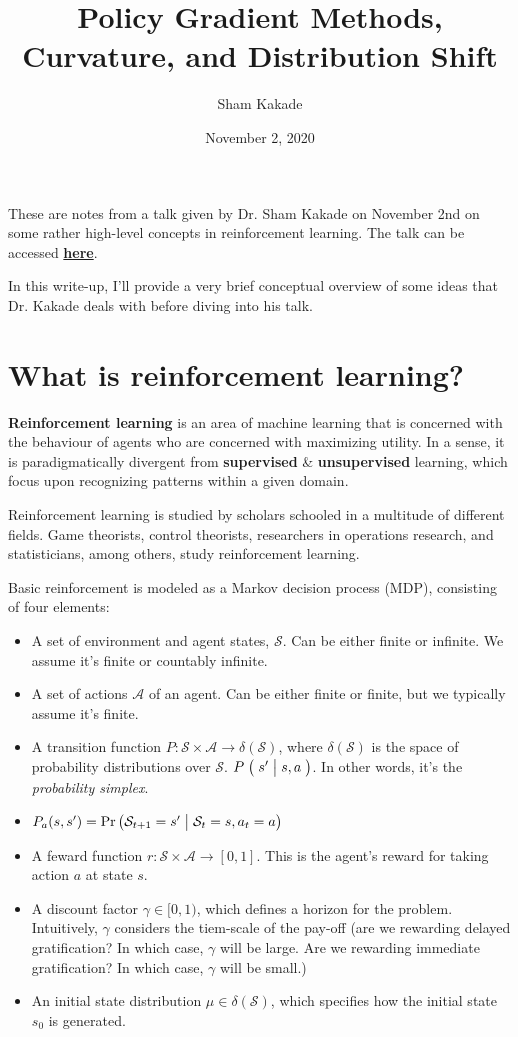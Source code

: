 \documentclass[12pt,reqno]{amsart}
\title{Policy Gradient Methods, Curvature, and Distribution Shift}
\date{November 2, 2020}
\author{Sham Kakade}
\newcommand{\Cond}[2]{\bigm( {#1} \bigm\vert {#2}\bigm)}
\begin{document}
\maketitle

These are notes from a talk given by Dr. Sham Kakade on November 2nd on some rather high-level concepts in reinforcement learning. The talk can be accessed 
\href{http://www.fields.utoronto.ca/talks/Policy-Gradient-Methods-Curvature-and-Distribution-Shift}{\textbf{here}}.

In this write-up, I'll provide a very brief conceptual overview of some ideas that Dr. Kakade deals with before diving into his talk.

\section{What is reinforcement learning?}
\textbf{Reinforcement learning} is an area of machine learning that is concerned with the behaviour of agents who are concerned with maximizing utility. In a sense, it is paradigmatically divergent from \textbf{supervised} \& \textbf{unsupervised} learning, which focus upon recognizing patterns within a given domain.

Reinforcement learning is studied by scholars schooled in a multitude of different fields. Game theorists, control theorists, researchers in operations research, and statisticians, among others, study reinforcement learning. 

Basic reinforcement is modeled as a Markov decision process (MDP), consisting of four elements:
\begin{itemize}
\item A set of environment and agent states, $\mathcal{S}$. Can be either finite or infinite. We assume it's finite or countably infinite.
\item A set of actions $\mathcal{A}$ of an agent. Can be either finite or finite, but we typically assume it's finite.
\item A transition function $P :\mathcal{S} \times \mathcal{A} \rightarrow \delta(\mathcal{S})$, where $\delta(\mathcal{S})$ is the space of probability distributions over $\mathcal{S}$. $P \Cond{s'}{s,a}$. In other words, it's the \textit{probability simplex}.
\item $P_{a}(s,s') = \Pr\left(\mathcal{S}_{t+1}=s' \bigm\vert \mathcal{S}_{t} = s, a_{t} = a \right)$
\item A feward function $r: \mathcal{S} \times \mathcal{A} \rightarrow [0,1]$. This is the agent's reward for taking action $a$ at state $s$.
\item A discount factor $\gamma \in [0,1)$, which defines a horizon for the problem. Intuitively, $\gamma$ considers the tiem-scale of the pay-off (are we rewarding delayed gratification? In which case, $\gamma$ will be large. Are we rewarding immediate gratification? In which case, $\gamma$ will be small.)
\item An initial state distribution $\mu \in \delta(\mathcal{S})$, which specifies how the initial state $s_{0}$ is generated.
\end{itemize}
\end{document}
